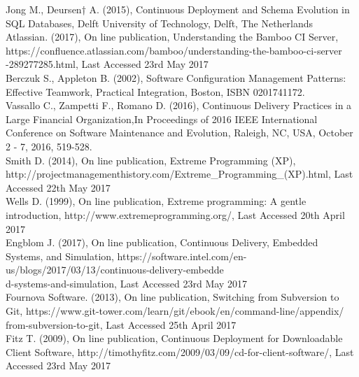 \begin{thebibliography}{0}

Jong M., Deursen† A. (2015), Continuous Deployment and Schema Evolution in SQL Databases, Delft University of Technology, Delft, The Netherlands
\\
Atlassian. (2017), On line publication, Understanding the Bamboo CI Server, https://confluence.atlassian.com/bamboo/understanding-the-bamboo-ci-server\\-289277285.html, Last Accessed 23rd May 2017
\\
Berczuk S., Appleton B. (2002), Software Configuration Management Patterns: Effective Teamwork, Practical Integration, Boston, ISBN 0201741172.
\\
Vassallo C., Zampetti F., Romano D. (2016), Continuous Delivery Practices in a Large Financial Organization,In Proceedings of 2016 IEEE International Conference on Software Maintenance and Evolution, Raleigh, NC, USA, October 2 - 7, 2016, 519-528.
\\
Smith D. (2014), On line publication, Extreme Programming (XP), http://projectmanagementhistory.com/Extreme\_Programming\_(XP).html, Last Accessed 22th May 2017
\\
Wells D. (1999), On line publication, Extreme programming: A gentle introduction, http://www.extremeprogramming.org/, Last Accessed 20th April 2017
\\
Engblom J. (2017), On line publication, Continuous Delivery, Embedded Systems, and Simulation, https://software.intel.com/en-us/blogs/2017/03/13/continuous-delivery-embedde\\d-systems-and-simulation, Last Accessed 23rd May 2017
\\
Fournova Software. (2013), On line publication, Switching from Subversion to Git, https://www.git-tower.com/learn/git/ebook/en/command-line/appendix/\\from-subversion-to-git, Last Accessed 25th April 2017
\\
Fitz T. (2009), On line publication, Continuous Deployment for Downloadable Client Software, http://timothyfitz.com/2009/03/09/cd-for-client-software/, Last Accessed 23rd May 2017

\end{thebibliography}
